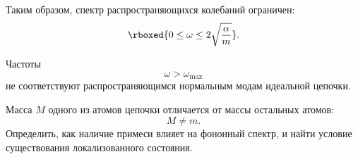 \documentclass[../final.tex]{subfiles}
\begin{document}
Таким образом, спектр распространяющихся колебаний ограничен:
%
\begin{equation*}
    \rboxed{
        0
        \leq
        \omega
        \leq
        2\sqrt{\frac{\alpha}{m}}
    }.
\end{equation*}

Частоты
%
\begin{equation*}
    \omega>\omega_{\max}
\end{equation*}
%
не соответствуют распространяющимся нормальным модам
идеальной цепочки.




\condition
Масса $M$ одного из атомов цепочки отличается
от массы остальных атомов:
%
\begin{equation*}
    M\neq m.
\end{equation*}
%
Определить, как наличие примеси влияет на фононный спектр,
и найти условие существования локализованного состояния.


\end{document}
